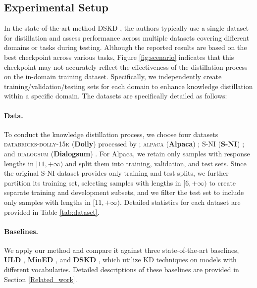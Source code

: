 \subsection{Experimental Setup}\label{sec:exp_setup}

In the state-of-the-art method DSKD \cite{zhang2024dual}, the authors typically use a single dataset for distillation and assess performance across multiple datasets covering different domains or tasks during testing. Although the reported results are based on the best checkpoint across various tasks, Figure \ref{fig:scenario} indicates that this checkpoint may not accurately reflect the effectiveness of the distillation process on the in-domain training dataset. Specifically, we independently create training/validation/testing sets for each domain to enhance knowledge distillation within a specific domain. The datasets are specifically detailed as follows:


\paragraph{Data.} To conduct the knowledge distillation process, we choose four datasets \textsc{databricks-dolly-15k} (\textbf{Dolly}) processed by \cite{gu2024minillm}; \textsc{alpaca} (\textbf{Alpaca}) \cite{alpaca}; \textsc{S-NI} (\textbf{S-NI}) \cite{wang-etal-2022-super}; and \textsc{dialogsum} (\textbf{Dialogsum}) \cite{chen2021dialogsum}. For Alpaca, we retain only samples with response lengths in \([11, +\infty)\) and split them into training, validation, and test sets. Since the original S-NI dataset provides only training and test splits, we further partition its training set, selecting samples with lengths in \([6, +\infty)\) to create separate training and development subsets, and we filter the test set to include only samples with lengths in \([11, +\infty)\). Detailed statistics for each dataset are provided in Table \ref{tab:dataset}.

\paragraph{Baselines.} We apply our method and compare it against three state-of-the-art baselines, \textbf{ULD} \cite{boizard2024towards}, \textbf{MinED} \cite{boizard2024towards}, and \textbf{DSKD} \cite{zhang2024dual}, which utilize KD techniques on models with different vocabularies. Detailed descriptions of these baselines are provided in Section \ref{Related_work}.

